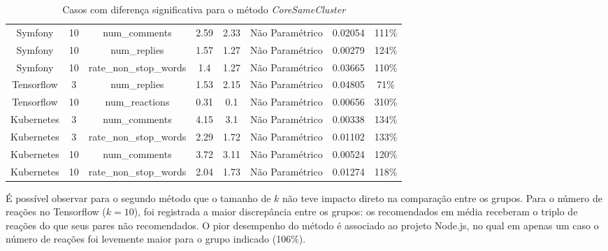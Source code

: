 \documentclass[12pt,openany,oneside,a4paper,english,brazil]{abntbibufjf}
\begin{document}
\begin{table}[htbp]
{\begin{tabular}{|c|c|c|c|c|c|c|c|}
Symfony          & 10         & num\_comments          & 2.59                        & 2.33                            &    Não Paramétrico                    & 0.02054          & 111\%              \\
Symfony          & 10         & num\_replies           & 1.57                        & 1.27                            &    Não Paramétrico                    & 0.00279          & 124\%              \\
Symfony          & 10         & rate\_non\_stop\_words & 1.4                         & 1.27                            &    Não Paramétrico                    & 0.03665          & 110\%              \\
Tensorflow       & 3          & num\_replies           & 1.53                        & 2.15                            &    Não Paramétrico                    & 0.04805          & 71\%               \\
Tensorflow       & 10         & num\_reactions         & 0.31                        & 0.1                             &    Não Paramétrico                    & 0.00656          & 310\%              \\
Kubernetes       & 3          & num\_comments          & 4.15                        & 3.1                             &     Não Paramétrico                   & 0.00338          & 134\%              \\
Kubernetes       & 3          & rate\_non\_stop\_words & 2.29                        & 1.72                            &     Não Paramétrico                   & 0.01102          & 133\%              \\
Kubernetes       & 10         & num\_comments          & 3.72                        & 3.11                            &     Não Paramétrico                   & 0.00524          & 120\%              \\
Kubernetes       & 10         & rate\_non\_stop\_words & 2.04                        & 1.73                            &    Não Paramétrico                    & 0.01274          & 118\%
\end{tabular}%
}
\hline
\caption{Casos com diferença significativa para o método \textit{CoreSameCluster}}
\label{tab:resultados-coresamecluster}
\end{table}

É possível observar para o segundo método que o tamanho de $k$ não teve impacto direto na comparação entre os grupos. Para o número de reações no Tensorflow ($k = 10$), foi registrada a maior discrepância entre os grupos: os recomendados em média receberam o triplo de reações do que seus pares não recomendados. O pior desempenho do método é associado ao projeto Node.js, no qual em apenas um caso o número de reações foi levemente maior para o grupo indicado (106\%).
\end{document}
